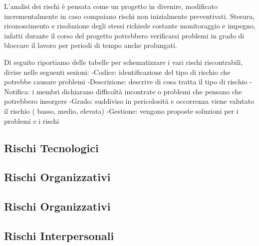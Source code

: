 L'analisi dei rischi è pensata come un progetto in divenire, modificato incrementalmente in caso
compaiano rischi non inizialmente preventivati. 
Stesura, riconoscimento e risoluzione degli stessi richiede costante monitoraggio e impegno, infatti
durante il corso del progetto potrebbero verificarsi problemi in grado di bloccare il lavoro per 
periodi di tempo anche prolungati. 

Di seguito riportiamo delle tabelle per schematizzare i vari rischi riscontrabili, divise nelle 
seguenti sezioni:
   -Codice: identificazione del tipo di rischio che potrebbe causare problemi
   -Descrizione: descrive di cosa tratta il tipo di rischio
   -Notifica: i membri dichiarano difficoltà incontrate o problemi che pensano che potrebbero insorgere
   -Grado: suddiviso in pericolosità e occorrenza viene valutato il rischio ( basso, medio, elevata)
   -Gestione: vengono proposte soluzioni per i problemi e i rischi

   \subsection{Rischi Tecnologici}
   \subsection{Rischi Organizzativi}
   \subsection{Rischi Organizzativi}
   \subsection{Rischi Interpersonali}
